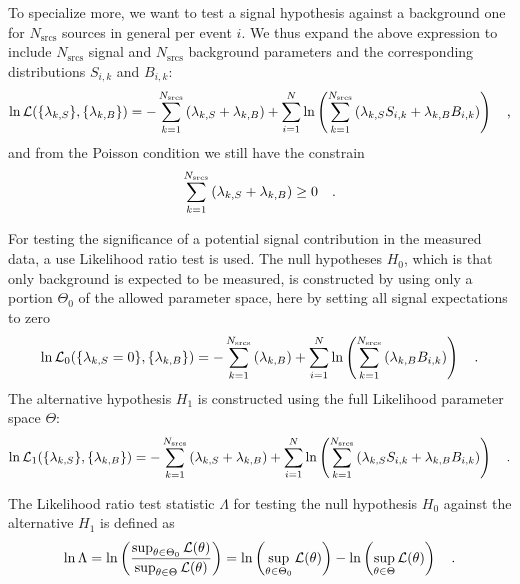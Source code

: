 To specialize more, we want to test a signal hypothesis against a background one for $N_\text{srcs}$ sources in general per event $i$.
We thus expand the above expression to include $N_\text{srcs}$ signal and $N_\text{srcs}$ background parameters and the corresponding distributions $S_{i,k}$ and $B_{i,k}$:
\begin{equation}
  \ln\mathcal{L}(\{\lambda_{k,S}\}, \{\lambda_{k,B}\})
  = -\sum_{k=1}^{N_\text{srcs}}\left(\lambda_{k,S}+\lambda_{k,B}\right) +
    \sum_{i=1}^N \ln\left(\sum_{k=1}^{N_\text{srcs}}\left(
      \lambda_{k,S} S_{i,k}+\lambda_{k,B} B_{i,k}\right)\right)
  \quad\text{,}
\end{equation}
and from the Poisson condition we still have the constrain
\begin{equation}
  \sum_{k=1}^{N_\text{srcs}}\left(\lambda_{k,S}+\lambda_{k,B}\right) \geq 0
  \quad\text{.}
\end{equation}

For testing the significance of a potential signal contribution in the measured data, a use Likelihood ratio test is used.
The null hypotheses $H_0$, which is that only background is expected to be measured, is constructed by using only a portion $\Theta_0$ of the allowed parameter space, here by setting all signal expectations to zero
\begin{equation}
  \ln\mathcal{L}_0(\{\lambda_{k,S}=0\}, \{\lambda_{k,B}\})
  = -\sum_{k=1}^{N_\text{srcs}}\left(\lambda_{k,B}\right) +
    \sum_{i=1}^N \ln\left(\sum_{k=1}^{N_\text{srcs}}\left(
      \lambda_{k,B} B_{i,k}\right)\right)
  \quad\text{.}
\end{equation}
The alternative hypothesis $H_1$ is constructed using the full Likelihood parameter space $\Theta$:
\begin{equation}
  \ln\mathcal{L}_1(\{\lambda_{k,S}\}, \{\lambda_{k,B}\})
  = -\sum_{k=1}^{N_\text{srcs}}\left(\lambda_{k,S}+
                                     \lambda_{k,B}\right) +
    \sum_{i=1}^N \ln\left(\sum_{k=1}^{N_\text{srcs}}\left(
      \lambda_{k,S} S_{i,k}+\lambda_{k,B} B_{i,k}\right)\right)
  \quad\text{.}
\end{equation}

The Likelihood ratio test statistic $\Lambda$ for testing the null hypothesis $H_0$ against the alternative $H_1$ is defined as 
\begin{equation}
  \ln\Lambda = \ln\left(\frac{\sup_{\theta \in \Theta_0} \mathcal{L}(\theta)}
                          {\sup_{\theta \in \Theta} \mathcal{L}(\theta)}\right)
  = \ln\left(\sup_{\theta \in \Theta_0} \mathcal{L}(\theta)\right) -
    \ln\left(\sup_{\theta \in \Theta} \mathcal{L}(\theta)\right)
  \quad\text{.}
\end{equation}

